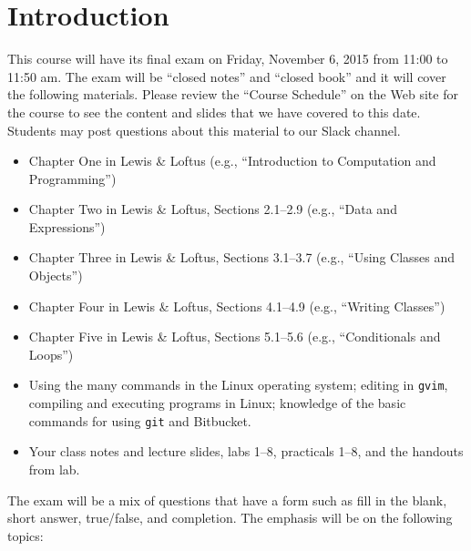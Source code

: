 


\section*{Introduction}

This course will have its final exam on Friday, November 6, 2015 from 11:00 to 11:50 am. The exam will be ``closed
notes'' and ``closed book'' and it will cover the following materials. Please review the ``Course Schedule'' on the Web
site for the course to see the content and slides that we have covered to this date. Students may post questions about
this material to our Slack channel.

\begin{itemize}

  \itemsep 0in

  \item Chapter One in Lewis \& Loftus (e.g., ``Introduction to Computation and Programming'')

  \item Chapter Two in Lewis \& Loftus, Sections 2.1--2.9 (e.g., ``Data and Expressions'')

  \item Chapter Three in Lewis \& Loftus, Sections 3.1--3.7 (e.g., ``Using Classes and Objects'')

  \item Chapter Four in Lewis \& Loftus, Sections 4.1--4.9 (e.g., ``Writing Classes'')

  \item Chapter Five in Lewis \& Loftus, Sections 5.1--5.6 (e.g., ``Conditionals and Loops'')

  \item Using the many commands in the Linux operating system; editing in {\tt gvim}, compiling and executing
    programs in Linux; knowledge of the basic commands for using {\tt git} and Bitbucket.

  \item Your class notes and lecture slides, labs 1--8, practicals 1--8, and the handouts from lab.

\end{itemize}

\noindent The exam will be a mix of questions that have a form such as fill in the blank, short answer, true/false, and
completion.  The emphasis will be on the following topics:

